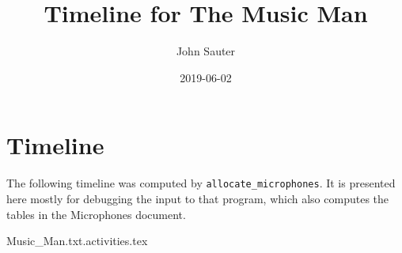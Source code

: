 \documentclass[letterpaper]{article}
\title{Timeline for The Music Man}
\author{John Sauter}
\date{2019-06-02}
\begin{document}
\maketitle
\tableofcontents
\newpage

\section {Timeline}
The following timeline was computed by {\tt allocate\_microphones}.
It is presented here mostly for debugging the input to that program,
which also computes the tables in the Microphones document.

 {Music_Man.txt.activities.tex}
\end{document}
